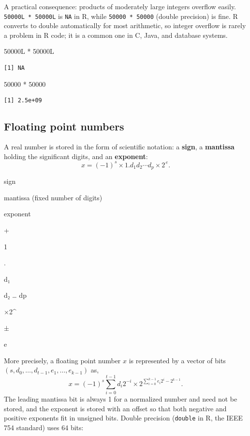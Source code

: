 \documentclass[
  letterpaper,
  DIV=11,
  numbers=noendperiod]{scrreprt}
\newenvironment{Shaded}{\begin{snugshade}}{\end{snugshade}}
\newcommand{\DecValTok}[1]{\textcolor[rgb]{0.68,0.00,0.00}{#1}}
\newcommand{\NormalTok}[1]{\textcolor[rgb]{0.00,0.23,0.31}{#1}}
\newcommand{\SpecialCharTok}[1]{\textcolor[rgb]{0.37,0.37,0.37}{#1}}
\begin{document}
A practical consequence: products of moderately large integers overflow
easily. \texttt{50000L\ *\ 50000L} is \texttt{NA} in R, while
\texttt{50000\ *\ 50000} (double precision) is fine. R converts to
double automatically for most arithmetic, so integer overflow is rarely
a problem in R code; it is a common one in C, Java, and database
systems.

\begin{Shaded}
\begin{Highlighting}[]
\DecValTok{50000}\NormalTok{L }\SpecialCharTok{*} \DecValTok{50000}\NormalTok{L}
\end{Highlighting}
\end{Shaded}

\begin{verbatim}
[1] NA
\end{verbatim}

\begin{Shaded}
\begin{Highlighting}[]
\DecValTok{50000} \SpecialCharTok{*} \DecValTok{50000}
\end{Highlighting}
\end{Shaded}

\begin{verbatim}
[1] 2.5e+09
\end{verbatim}

\subsection{Floating point numbers}\label{floating-point-numbers}

A real number is stored in the form of scientific notation: a
\textbf{sign}, a \textbf{mantissa} holding the significant digits, and
an \textbf{exponent}: \[
x = (-1)^{s} \times 1.d_1 d_2 \cdots d_p \times 2^{\,e}.
\]

sign

mantissa (fixed number of digits)

exponent

+

1

.

d₁

d₂ \ldots{} dp

×2\^{}

±

e

More precisely, a floating point number \(x\) is represented by a vector
of bits \((s,d_0,\ldots,d_{t-1},e_1,\ldots, e_{k-1})\) as, \[
x = (-1)^s \sum_{i=0}^{t-1}d_i2^{-i}\times 2^{\sum_{i=0}^{k-1}e_i2^i-2^{k-1}}.
\] The leading mantissa bit is always 1 for a normalized number and need
not be stored, and the exponent is stored with an offset so that both
negative and positive exponents fit in unsigned bits. Double precision
(\texttt{double} in R, the IEEE 754 standard) uses 64 bits:
\end{document}
